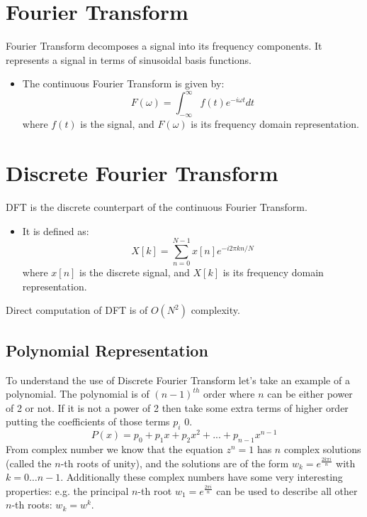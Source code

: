 \documentclass[28pt]{report}
\begin{document}
\section{Fourier Transform}
Fourier Transform decomposes a signal into its frequency components.
It represents a signal in terms of sinusoidal basis functions.
\begin{itemize}
    \item The continuous Fourier Transform is given by:
    \[ F(\omega) = \int_{-\infty}^{\infty} f(t) e^{-i\omega t} dt \]
    where $f(t)$ is the signal, and $F(\omega)$ is its frequency domain representation.
  \end{itemize}

\section{Discrete Fourier Transform}

DFT is the discrete counterpart of the continuous Fourier Transform.
\begin{itemize}
    \item It is defined as:
    \[ X[k] = \sum_{n=0}^{N-1} x[n] e^{-i2\pi kn/N} \]
    where $x[n]$ is the discrete signal, and $X[k]$ is its frequency domain representation.
      \end{itemize}
Direct computation of DFT is of $O(N^2)$ complexity.
\pagebreak
\subsection{Polynomial Representation}
To understand the use of Discrete Fourier Transform let's take an example of a polynomial. The polynomial is of $(n-1)^{th}$ order where $n$ can be either power of 2 or not. If it is not a power of 2 then take some extra terms of higher order putting the coefficients of those terms $p_i$ 0. \\
              \begin{equation*}
                  P(x) = p_0 + p_1x + p_2x^2 + ... + p_{n-1}x^{n-1}
              \end{equation*}
              From complex number we know that the equation $z^n = 1$ has $n$ complex solutions (called the $n$-th roots of unity), and the solutions are of the form $w_{k} = e^{\frac{2 k \pi i}{n}}$ with $k = 0 \dots n-1$. Additionally these complex numbers have some very interesting properties: e.g. the principal $n$-th root $ w_{1} = e^{\frac{2 \pi i}{n}}$ can be used to describe all other $n$-th roots: $w_{k} = w^k$.
              \\
              
\end{document}
